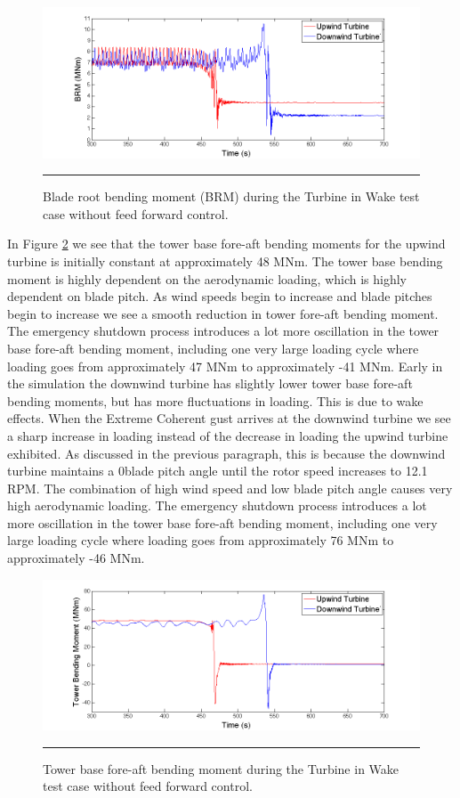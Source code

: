 \begin{figure}[htbp] \label{fig6-31}
	\centering
		\includegraphics[trim = {1cm 0 2cm 0}, clip, width = \linewidth]{Figures/ch6Figures/fig6-31.png}
		\rule{35em}{0.5pt}
	\caption{Blade root bending moment (BRM) during the Turbine in Wake test case without feed forward control.}
\end{figure}

In Figure \ref{fig6-32} we see that the tower base fore-aft bending moments for the upwind turbine is initially constant at approximately 48 MNm. The tower base bending moment is highly dependent on the aerodynamic loading, which is highly dependent on blade pitch. As wind speeds begin to increase and blade pitches begin to increase we see a smooth reduction in tower fore-aft bending moment. The emergency shutdown process introduces a lot more oscillation in the tower base fore-aft bending moment, including one very large loading cycle where loading goes from approximately 47 MNm to approximately -41 MNm. Early in the simulation the downwind turbine has slightly lower tower base fore-aft bending moments, but has more fluctuations in loading. This is due to wake effects. When the Extreme Coherent gust arrives at the downwind turbine we see a sharp increase in loading instead of the decrease in loading the upwind turbine exhibited. As discussed in the previous paragraph, this is because the downwind turbine maintains a 0\degree blade pitch angle until the rotor speed increases to 12.1 RPM. The combination of high wind speed and low blade pitch angle causes very high aerodynamic loading. The emergency shutdown process introduces a lot more oscillation in the tower base fore-aft bending moment, including one very large loading cycle where loading goes from approximately 76 MNm to approximately -46 MNm.

\begin{figure}[htbp] \label{fig6-32}
	\centering
		\includegraphics[trim = {1cm 0 2cm 0}, clip, width = \linewidth]{Figures/ch6Figures/fig6-32.png}
		\rule{35em}{0.5pt}
	\caption{Tower base fore-aft bending moment during the Turbine in Wake test case without feed forward control.}
\end{figure}

